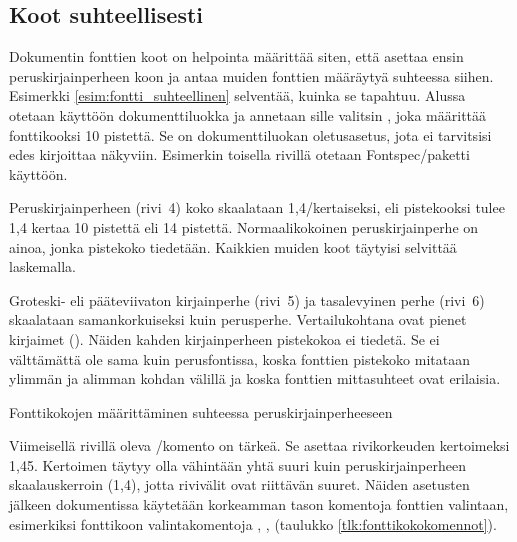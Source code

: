 \subsection{Koot suhteellisesti}
\label{luku:fontti_suhteellinen}

Dokumentin fonttien koot on helpointa määrittää siten, että asettaa
ensin peruskirjainperheen koon ja antaa muiden fonttien määräytyä
suhteessa siihen. Esimerkki \ref{esim:fontti_suhteellinen} selventää,
kuinka se tapahtuu. Alussa otetaan käyttöön dokumenttiluokka
 ja annetaan sille valitsin \koodi{10pt}, joka määrittää
fonttikooksi 10 pistettä. Se on dokumenttiluokan ole\-tus\-ase\-tus,
jota ei tarvitsisi edes kirjoittaa näkyviin. Esimerkin toisella rivillä
otetaan Fontspec\-/paketti käyttöön.

Peruskirjainperheen (rivi~4) koko skaalataan 1,4\-/kertaiseksi, eli
pistekooksi tulee 1,4 kertaa 10 pistettä eli 14 pistettä.
Normaalikokoinen peruskirjainperhe on ainoa, jonka pistekoko tiedetään.
Kaikkien muiden koot täytyisi selvittää laskemalla.

Groteski- eli pääteviivaton kirjainperhe (rivi~5) ja tasalevyinen perhe
(rivi~6) skaalataan samankorkuiseksi kuin perusperhe. Vertailukohtana
ovat pienet kirjaimet (). Näiden kahden
kirjainperheen pistekokoa ei tiedetä. Se ei välttämättä ole sama kuin
perusfontissa, koska fonttien pistekoko mitataan ylimmän ja alimman
kohdan välillä ja koska fonttien mittasuhteet ovat erilaisia.

\begin{esimerkki}
\caption{Fonttikokojen määrittäminen suhteessa peruskirjainperheeseen}
\label{esim:fontti_suhteellinen}
\end{esimerkki}

Viimeisellä rivillä oleva \-/komento on tärkeä.
Se asettaa rivikorkeuden kertoimeksi 1,45. Kertoimen täytyy olla
vähintään yhtä suuri kuin peruskirjainperheen skaalauskerroin (1,4),
jotta rivivälit ovat riittävän suuret. Näiden asetusten jälkeen
dokumentissa käytetään korkeamman tason komentoja fonttien valintaan,
esimerkiksi fonttikoon valintakomentoja ,
,  (taulukko
\ref{tlk:fonttikokokomennot}).

